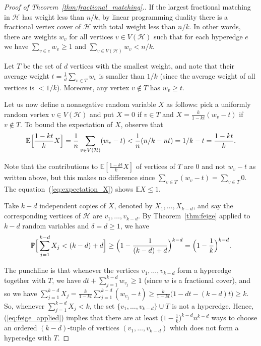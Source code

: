 \documentclass[10pt]{article}
\newcommand{\bE}{\mathbb{E}}
\newcommand{\cH}{\mathcal{H}}
\newcommand{\Pb}{\mathbb P}
\begin{document}
\begin{proof}[Proof of Theorem~\ref{thm:fractional_matching}.]
If the largest fractional matching in $\cH$ has weight less than $n/k$, by linear programming duality there is a fractional vertex cover of $\cH$ with total weight less than $n/k$. In other words, there are weights $w_v$ for all vertices $v\in V(\cH)$ such that for each hyperedge $e$ we have $\sum_{v\in e} w_v\geq 1$ and $\sum_{v\in V(\cH)}w_v<n/k$.

Let $T$ be the set of $d$ vertices with the smallest weight, and note that their average weight $t=\frac{1}{d}\sum_{v\in T}w_v$ is smaller than $1/k$ (since the average weight of all vertices is $<1/k$). Moreover, any vertex $v\notin T$ has $w_v\geq t$. 

Let us now define a nonnegative random variable $X$ as follows: pick a uniformly random vertex $v\in V(\cH)$ and put $X=0$ if $v\in T$ and $X=\frac{k}{1-kt}(w_v-t)$ if $v\notin T$. To bound the expectation of $X$, observe that
\vspace{-0.2cm}
\begin{equation}\label{eq:expectation_X}
    \bE\Big[\frac{1-kt}{k}X\Big]=\frac{1}{n}\sum_{v\in V(\cH)}(w_v-t)<\frac{1}{n}(n/k-nt)=1/k-t= \frac{1-kt}{k}.\vspace{-0.2cm}
\end{equation}


Note that the contributions to $\bE[\frac{1-kt}{k}X]$ of vertices of $T$ are $0$ and not $w_v-t$ as written above, but this makes no difference since $\sum_{v\in T}(w_v-t)=\sum_{v\in T}0$. The equation~(\ref{eq:expectation_X}) shows $\bE X\leq 1$.

Take $k-d$ independent copies of $X$, denoted by $X_1, \dots, X_{k-d}$, and say the corresponding vertices of $\cH$ are $v_1, \dots, v_{k-d}$. By Theorem~\ref{thm:feige} applied to $k-d$ random variables and $\delta=d\geq 1$, we have 
\vspace{-0.2cm}
\begin{equation}\label{eq:feige_applied}
\Pb\Big[\sum_{j=1}^{k-d} X_j< (k-d)+d\Big]\geq \Big(1-\frac{1}{(k-d)+d}\Big)^{k-d}=\Big(1-\frac{1}{k}\Big)^{k-d}.\vspace{-0.2cm}
\end{equation}
\vspace{-0.2cm}

The punchline is that whenever the vertices $v_1, \dots, v_{k-d}$ form a hyperedge together with $T$, we have $dt+\sum_{j=1}^{k-d}w_{v_j}\geq 1$ (since $w$ is a fractional cover), and so we have $\sum_{j=1}^{k-d} X_j=\frac{k}{1-kt}\sum_{j=1}^{k-d}(w_{v_j}-t)\geq \frac{k}{1-kt}\big(1-dt-(k-d)t\big)\geq k$. So, whenever $\sum_{j=1}^{k-d} X_j<k$, the set $\{v_{1}, \dots, v_{k-d}\}\cup T$ is not a hyperedge. Hence, (\ref{eq:feige_applied}) implies that there are at least $\big(1-\frac{1}{k}\big)^{k-d}n^{k-d}$ ways to choose an ordered $(k-d)$-tuple of vertices $(v_1, \dots, v_{k-d})$ which does not form a hyperedge with $T$. 


\end{proof}
\end{document}
